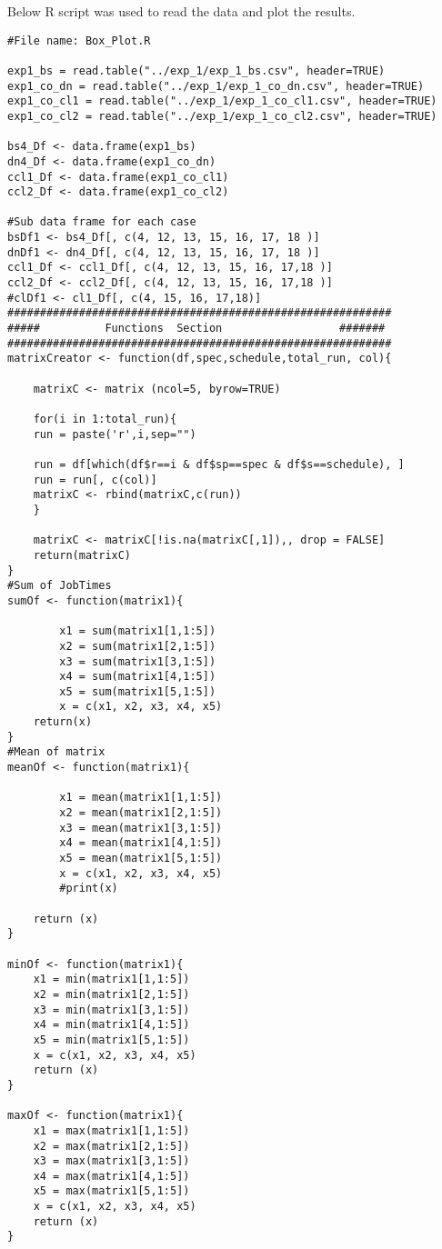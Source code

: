 Below R script was used to read the data and plot the results. 

\begin{verbatim}
#File name: Box_Plot.R

exp1_bs = read.table("../exp_1/exp_1_bs.csv", header=TRUE)
exp1_co_dn = read.table("../exp_1/exp_1_co_dn.csv", header=TRUE)
exp1_co_cl1 = read.table("../exp_1/exp_1_co_cl1.csv", header=TRUE)
exp1_co_cl2 = read.table("../exp_1/exp_1_co_cl2.csv", header=TRUE)

bs4_Df <- data.frame(exp1_bs)
dn4_Df <- data.frame(exp1_co_dn)
ccl1_Df <- data.frame(exp1_co_cl1)
ccl2_Df <- data.frame(exp1_co_cl2)

#Sub data frame for each case
bsDf1 <- bs4_Df[, c(4, 12, 13, 15, 16, 17, 18 )]
dnDf1 <- dn4_Df[, c(4, 12, 13, 15, 16, 17, 18 )]
ccl1_Df <- ccl1_Df[, c(4, 12, 13, 15, 16, 17,18 )]
ccl2_Df <- ccl2_Df[, c(4, 12, 13, 15, 16, 17,18 )]
#clDf1 <- cl1_Df[, c(4, 15, 16, 17,18)]
###########################################################
#####          Functions  Section                  #######
###########################################################
matrixCreator <- function(df,spec,schedule,total_run, col){

	matrixC <- matrix (ncol=5, byrow=TRUE)

	for(i in 1:total_run){
	run = paste('r',i,sep="")
	
	run = df[which(df$r==i & df$sp==spec & df$s==schedule), ]
	run = run[, c(col)]
	matrixC <- rbind(matrixC,c(run))
	}

	matrixC <- matrixC[!is.na(matrixC[,1]),, drop = FALSE]
	return(matrixC)
}
#Sum of JobTimes
sumOf <- function(matrix1){
   
   		x1 = sum(matrix1[1,1:5])
		x2 = sum(matrix1[2,1:5])
		x3 = sum(matrix1[3,1:5])
		x4 = sum(matrix1[4,1:5])
		x5 = sum(matrix1[5,1:5]) 
		x = c(x1, x2, x3, x4, x5)
 	return(x)
}
#Mean of matrix
meanOf <- function(matrix1){
    
		x1 = mean(matrix1[1,1:5])
		x2 = mean(matrix1[2,1:5])
		x3 = mean(matrix1[3,1:5])
		x4 = mean(matrix1[4,1:5])
		x5 = mean(matrix1[5,1:5]) 
		x = c(x1, x2, x3, x4, x5)
		#print(x)
		
 	return (x)
}

minOf <- function(matrix1){
	x1 = min(matrix1[1,1:5])
	x2 = min(matrix1[2,1:5])
	x3 = min(matrix1[3,1:5])
	x4 = min(matrix1[4,1:5])
	x5 = min(matrix1[5,1:5])
	x = c(x1, x2, x3, x4, x5)
	return (x)
}

maxOf <- function(matrix1){
	x1 = max(matrix1[1,1:5])
	x2 = max(matrix1[2,1:5])
	x3 = max(matrix1[3,1:5])
	x4 = max(matrix1[4,1:5])
	x5 = max(matrix1[5,1:5])
	x = c(x1, x2, x3, x4, x5)
	return (x)
}


\end{verbatim}

